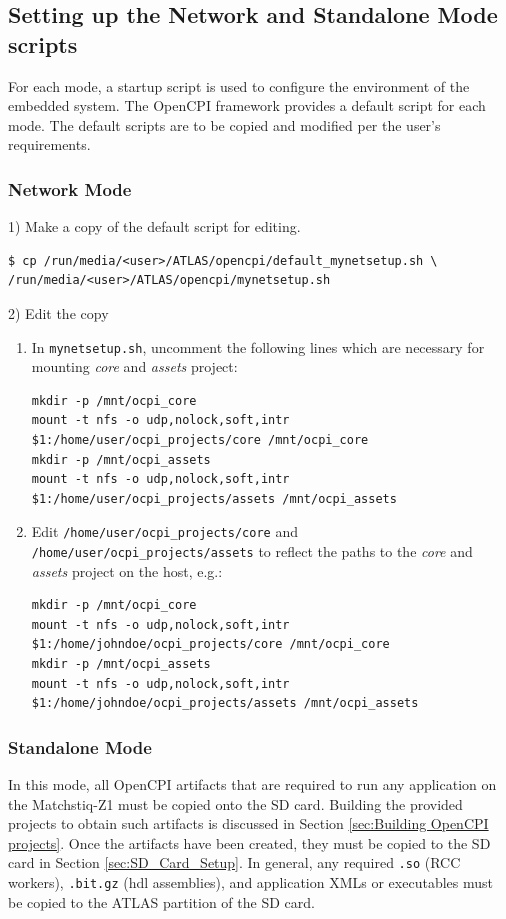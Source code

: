 \begin{flushleft}

\subsection{Setting up the Network and Standalone Mode scripts}

For each mode, a startup script is used to configure the environment of the embedded system. The OpenCPI framework provides a default script for each mode. The default scripts are to be copied and modified per the user's requirements.\par\medskip

\subsubsection{Network Mode}
1) Make a copy of the default script for editing.
\begin{verbatim}
$ cp /run/media/<user>/ATLAS/opencpi/default_mynetsetup.sh \
/run/media/<user>/ATLAS/opencpi/mynetsetup.sh
\end{verbatim}\medskip

2) Edit the copy
\begin{enumerate}
\item In \texttt{mynetsetup.sh}, uncomment the following lines which are necessary for mounting \textit{core} and \textit{assets} project:

\begin{verbatim}
mkdir -p /mnt/ocpi_core
mount -t nfs -o udp,nolock,soft,intr $1:/home/user/ocpi_projects/core /mnt/ocpi_core
mkdir -p /mnt/ocpi_assets
mount -t nfs -o udp,nolock,soft,intr $1:/home/user/ocpi_projects/assets /mnt/ocpi_assets
\end{verbatim}
 \item Edit \texttt{/home/user/ocpi\_projects/core} and \texttt{/home/user/ocpi\_projects/assets} to reflect the paths to the \textit{core} and \textit{assets} project on the host, e.g.:
\begin{verbatim}
mkdir -p /mnt/ocpi_core
mount -t nfs -o udp,nolock,soft,intr $1:/home/johndoe/ocpi_projects/core /mnt/ocpi_core
mkdir -p /mnt/ocpi_assets
mount -t nfs -o udp,nolock,soft,intr $1:/home/johndoe/ocpi_projects/assets /mnt/ocpi_assets
\end{verbatim}
\end{enumerate}

\subsubsection{Standalone Mode}
In this mode, all OpenCPI artifacts that are required to run any application on the Matchstiq-Z1 must be copied onto the SD card.  Building the provided projects to obtain such artifacts is discussed in Section \ref{sec:Building OpenCPI projects}. Once the artifacts have been created, they must be copied to the SD card in Section \ref{sec:SD_Card_Setup}. In general, any required \texttt{.so} (RCC workers), \texttt{.bit.gz} (hdl assemblies), and application XMLs or executables must be copied to the ATLAS partition of the SD card. \medskip


\end{flushleft}
